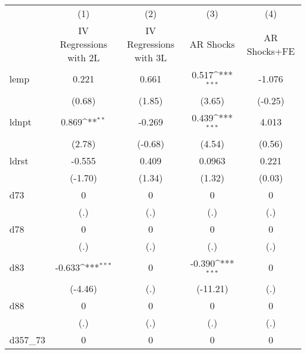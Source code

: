 {
\def\sym#1{\ifmmode^{#1}\else\(^{#1}\)\fi}
\begin{tabular}{l*{4}{c}}
\hline\hline
            &\multicolumn{1}{c}{(1)}&\multicolumn{1}{c}{(2)}&\multicolumn{1}{c}{(3)}&\multicolumn{1}{c}{(4)}\\
            &\multicolumn{1}{c}{IV Regressions with 2L}&\multicolumn{1}{c}{IV Regressions with 3L}&\multicolumn{1}{c}{AR Shocks}&\multicolumn{1}{c}{AR Shocks+FE}\\
\hline
lemp        &       0.221         &       0.661         &       0.517\sym{***}&      -1.076         \\
            &      (0.68)         &      (1.85)         &      (3.65)         &     (-0.25)         \\
[1em]
ldnpt       &       0.869\sym{**} &      -0.269         &       0.439\sym{***}&       4.013         \\
            &      (2.78)         &     (-0.68)         &      (4.54)         &      (0.56)         \\
[1em]
ldrst       &      -0.555         &       0.409         &      0.0963         &       0.221         \\
            &     (-1.70)         &      (1.34)         &      (1.32)         &      (0.03)         \\
[1em]
d73         &           0         &           0         &           0         &           0         \\
            &         (.)         &         (.)         &         (.)         &         (.)         \\
[1em]
d78         &           0         &           0         &           0         &           0         \\
            &         (.)         &         (.)         &         (.)         &         (.)         \\
[1em]
d83         &      -0.633\sym{***}&           0         &      -0.390\sym{***}&           0         \\
            &     (-4.46)         &         (.)         &    (-11.21)         &         (.)         \\
[1em]
d88         &           0         &           0         &           0         &           0         \\
            &         (.)         &         (.)         &         (.)         &         (.)         \\
[1em]
d357\_73     &           0         &           0         &           0         &           0         \\

\end{tabular}}
